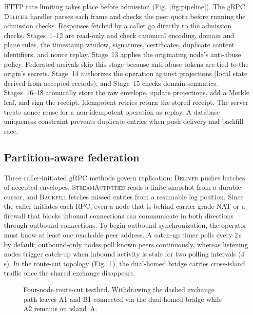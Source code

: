 \documentclass[conference,a4paper,10pt]{IEEEtran}
\begin{document}
HTTP rate limiting takes place before admission (Fig.~\ref{fig:pipeline}). The gRPC \textsc{Deliver} handler parses each frame and checks the peer quota before running the admission checks. Responses fetched by a caller go directly to the admission checks. Stages~1--12 are read-only and check canonical encoding, domain and plane rules, the timestamp window, signatures, certificates, duplicate content identifiers, and nonce replay. Stage~13 applies the originating node's anti-abuse policy. Federated arrivals skip this stage because anti-abuse tokens are tied to the origin's secrets. Stage~14 authorizes the operation against projections (local state derived from accepted records), and Stage~15 checks domain semantics. Stages~16--18 atomically store the raw envelope, update projections, add a Merkle leaf, and sign the receipt. Idempotent retries return the stored receipt. The server treats nonce reuse for a non-idempotent operation as replay. A database uniqueness constraint prevents duplicate entries when push delivery and backfill race.

\subsection{Partition-aware federation}

Three caller-initiated gRPC methods govern replication: \textsc{Deliver} pushes batches of accepted envelopes, \textsc{StreamActivities} reads a finite snapshot from a durable cursor, and \textsc{Backfill} fetches missed entries from a resumable log position. Since the caller initiates each RPC, even a node that is behind carrier-grade NAT or a firewall that blocks inbound connections can communicate in both directions through outbound connections. To begin outbound synchronization, the operator must know at least one reachable peer address. A catch-up timer polls every 2\,s by default; outbound-only nodes poll known peers continuously, whereas listening nodes trigger catch-up when inbound activity is stale for two polling intervals (4\,s). In the route-cut topology (Fig.~\ref{fig:topology}), the dual-homed bridge carries cross-island traffic once the shared exchange disappears.

\begin{figure}[!t]
  \centering
  \caption{Four-node route-cut testbed. Withdrawing the dashed exchange path leaves A1 and B1 connected via the dual-homed bridge while A2 remains on island~A.}
  \label{fig:topology}
\end{figure}
\end{document}
